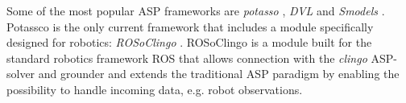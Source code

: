 Some of the most popular ASP frameworks are \textit{potasso} \citep{gekakaosscsc11a}, \textit{DVL} \citep{gekakaosscsc11a} and \textit{Smodels} \citep{Niemela2000_Smodels}.
Potassco is the only current framework that includes a module specifically designed for robotics: \textit{ROSoClingo} \citep{AndresOSSR13_rosoclingo}.
ROSoClingo is a module built for the standard robotics framework ROS \citep{Quigley09_ROS} that allows connection with the \textit{clingo} ASP-solver and grounder and extends the traditional ASP paradigm by enabling the possibility to handle incoming data, e.g. robot observations.











